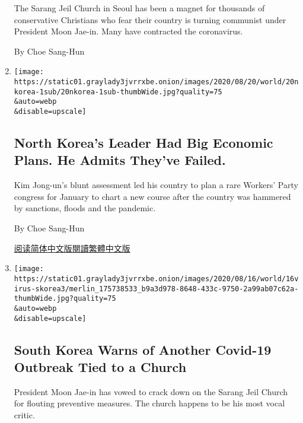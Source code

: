 \begin{enumerate}
  The Sarang Jeil Church in Seoul has been a magnet for thousands of
  conservative Christians who fear their country is turning communist
  under President Moon Jae-in. Many have contracted the coronavirus.

  By Choe Sang-Hun
\item
  \href{/2020/08/19/world/asia/north-korea-economy-coronavirus.html}{}

  \texttt{[image: https://static01.graylady3jvrrxbe.onion/images/2020/08/20/world/20nkorea-1sub/20nkorea-1sub-thumbWide.jpg?quality=75\\\&auto=webp\\\&disable=upscale]}

  \hypertarget{north-koreas-leader-had-big-economic-plans-he-admits-theyve-failed}{%
  \subsection{North Korea's Leader Had Big Economic Plans. He Admits
  They've
  Failed.}\label{north-koreas-leader-had-big-economic-plans-he-admits-theyve-failed}}

  Kim Jong-un's blunt assessment led his country to plan a rare Workers'
  Party congress for January to chart a new course after the country was
  hammered by sanctions, floods and the pandemic.

  By Choe Sang-Hun

  \href{https://cn.nytimes3xbfgragh.onion/asia-pacific/20200821/north-korea-economy-coronavirus/}{阅读简体中文版}\href{https://cn.nytimes3xbfgragh.onion/asia-pacific/20200821/north-korea-economy-coronavirus/zh-hant/}{閱讀繁體中文版}
\item
  \href{/2020/08/16/world/asia/coronavirus-south-korea-church-sarang-jeil.html}{}

  \texttt{[image: https://static01.graylady3jvrrxbe.onion/images/2020/08/16/world/16virus-skorea3/merlin\_175738533\_b9a3d978-8648-433c-9750-2a99ab07c62a-thumbWide.jpg?quality=75\\\&auto=webp\\\&disable=upscale]}

  \hypertarget{south-korea-warns-of-another-covid-19-outbreak-tied-to-a-church}{%
  \subsection{South Korea Warns of Another Covid-19 Outbreak Tied to a
  Church}\label{south-korea-warns-of-another-covid-19-outbreak-tied-to-a-church}}

  President Moon Jae-in has vowed to crack down on the Sarang ​Jeil
  Church for flouting preventive measures. The church happens to be his
  most vocal critic.


\end{enumerate}

